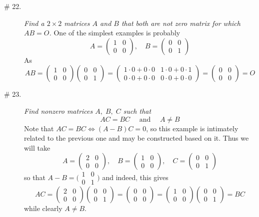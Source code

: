 \documentclass[8pt]{article} %
\begin{document}
\begin{description}
{	}
\item[\# 22.]{{\it Find a $2\times2$ matrices $A$ and $B$ that both are not zero matrix for which $AB=O$.}
	One of the simplest examples is probably
	\[A=\begin{pmatrix}1&0\\0&0\end{pmatrix},\quad B=\begin{pmatrix}0&0\\0&1\end{pmatrix}\]
	As \[AB=\begin{pmatrix}1&0\\0&0\end{pmatrix}\begin{pmatrix}0&0\\0&1\end{pmatrix}=\begin{pmatrix}
		1\cdot0+0\cdot0&1\cdot0+0\cdot1\\0\cdot0+0\cdot0&0\cdot0+0\cdot0
	\end{pmatrix}=\begin{pmatrix}0&0\\0&0\end{pmatrix}=O\]
	}
\item[\# 23.]{{\it Find nonzero matrices $A,\;B,\;C$ such that}
	\[AC=BC\quad\mbox{ and }\quad A\neq B\]
	Note that $AC=BC\iff (A-B)C=0$, so this example is intimately related to the previous one and may be constructed based on it. Thus we will
	take\[A=\begin{pmatrix}2&0\\0&0\end{pmatrix},\quad B=\begin{pmatrix}1&0\\0&0\end{pmatrix},\quad C=\begin{pmatrix}0&0\\0&1\end{pmatrix}\]
	so that $A-B=\bigl(\begin{smallmatrix}1&0\\0&1\end{smallmatrix}\bigr)$ and indeed, this gives
	\[AC=\begin{pmatrix}2&0\\0&0\end{pmatrix}\begin{pmatrix}0&0\\0&1\end{pmatrix}=\begin{pmatrix}0&0\\0&0\end{pmatrix}=
	\begin{pmatrix}1&0\\0&0\end{pmatrix}\begin{pmatrix}0&0\\0&1\end{pmatrix}=BC\]
	while clearly $A\neq B$.
	}
\end{description}
\end{document}
